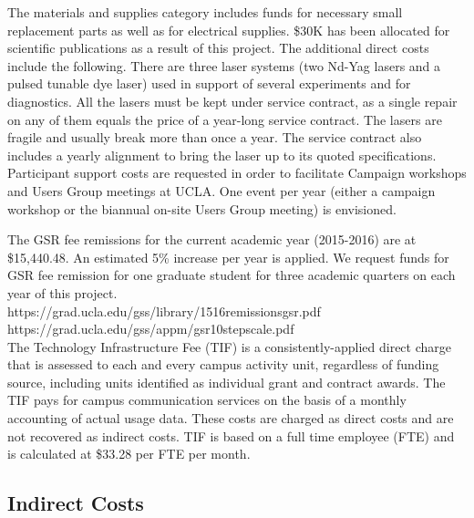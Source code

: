 \documentclass[11pt]{article}
\begin{document}
The materials and supplies category includes funds for necessary small
replacement parts as well as for electrical supplies. \$30K has been
allocated for scientific publications as a result of this project. The
additional direct costs include the following.  There are three laser
systems (two Nd-Yag lasers and a pulsed tunable dye laser) used in
support of several experiments and for diagnostics. All the lasers
must be kept under service contract, as a single repair on any of them
equals the price of a year-long service contract. The lasers are
fragile and usually break more than once a year. The service contract
also includes a yearly alignment to bring the laser up to its quoted
specifications.  Participant support costs are requested in order to
facilitate Campaign workshops and Users Group meetings at UCLA.  One
event per year (either a campaign workshop or the biannual on-site
Users Group meeting) is envisioned.


The GSR fee remissions for the current academic year (2015-2016) are
at \$15,440.48. An estimated 5\% increase per year is applied. We
request funds for GSR fee remission for one graduate student for three
academic quarters on each year of this project. \\[0.1truein]
{\ttfamily https://grad.ucla.edu/gss/library/1516remissionsgsr.pdf} \\
{\ttfamily https://grad.ucla.edu/gss/appm/gsr10stepscale.pdf} \\

The Technology Infrastructure Fee (TIF) is a consistently-applied direct charge that
is assessed to each and every campus activity unit, regardless of
funding source, including units identified as individual grant and
contract awards.  The TIF pays for campus communication services on
the basis of a monthly accounting of actual usage data.  These costs
are charged as direct costs and are not recovered as indirect costs.
TIF is based on a full time employee (FTE) and is calculated at \$33.28
per FTE per month.  

\subsection*{Indirect Costs}
\end{document}
